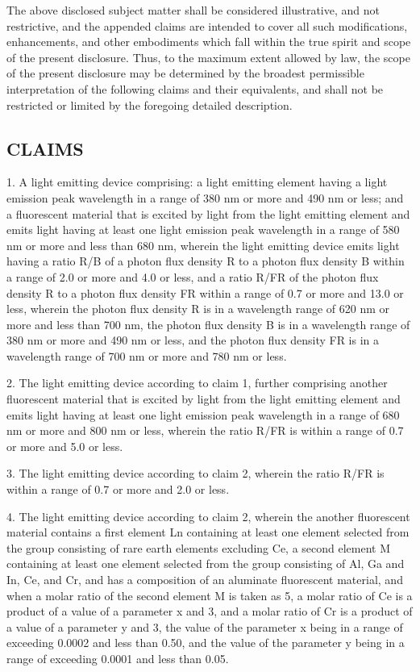 \documentclass[11pt,a4paper]{article}
\begin{document}
The above disclosed subject matter shall be considered illustrative, and not restrictive, and the appended claims are intended to cover all such modifications, enhancements, and other embodiments which fall within the true spirit and scope of the present disclosure. Thus, to the maximum extent allowed by law, the scope of the present disclosure may be determined by the broadest permissible interpretation of the following claims and their equivalents, and shall not be restricted or limited by the foregoing detailed description.

\subsection{CLAIMS}

1. A light emitting device comprising: a light emitting element having a light emission peak wavelength in a range of 380 nm or more and 490 nm or less; and a fluorescent material that is excited by light from the light emitting element and emits light having at least one light emission peak wavelength in a range of 580 nm or more and less than 680 nm, wherein the light emitting device emits light having a ratio R/B of a photon flux density R to a photon flux density B within a range of 2.0 or more and 4.0 or less, and a ratio R/FR of the photon flux density R to a photon flux density FR within a range of 0.7 or more and 13.0 or less, wherein the photon flux density R is in a wavelength range of 620 nm or more and less than 700 nm, the photon flux density B is in a wavelength range of 380 nm or more and 490 nm or less, and the photon flux density FR is in a wavelength range of 700 nm or more and 780 nm or less.

2. The light emitting device according to claim 1, further comprising another fluorescent material that is excited by light from the light emitting element and emits light having at least one light emission peak wavelength in a range of 680 nm or more and 800 nm or less, wherein the ratio R/FR is within a range of 0.7 or more and 5.0 or less.

3. The light emitting device according to claim 2, wherein the ratio R/FR is within a range of 0.7 or more and 2.0 or less.

4. The light emitting device according to claim 2, wherein the another fluorescent material contains a first element Ln containing at least one element selected from the group consisting of rare earth elements excluding Ce, a second element M containing at least one element selected from the group consisting of Al, Ga and In, Ce, and Cr, and has a composition of an aluminate fluorescent material, and when a molar ratio of the second element M is taken as 5, a molar ratio of Ce is a product of a value of a parameter x and 3, and a molar ratio of Cr is a product of a value of a parameter y and 3, the value of the parameter x being in a range of exceeding 0.0002 and less than 0.50, and the value of the parameter y being in a range of exceeding 0.0001 and less than 0.05.
\end{document}
